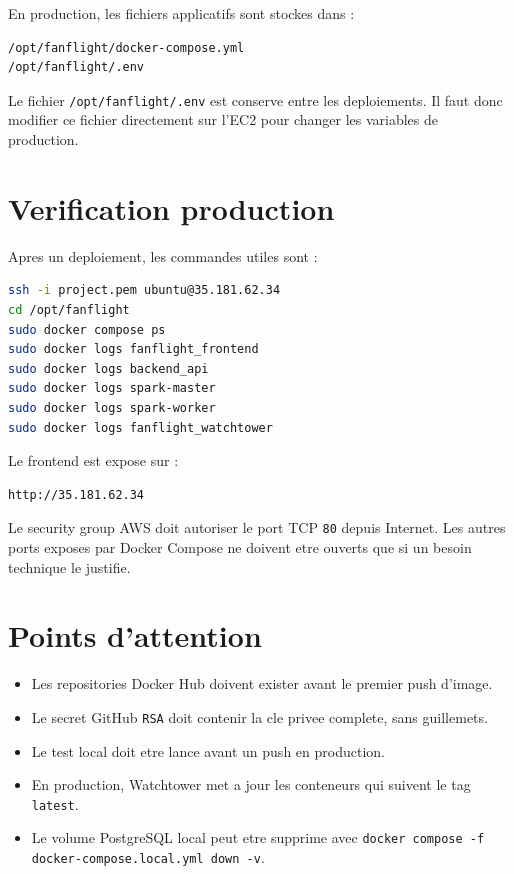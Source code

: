 \documentclass[12pt,a4paper]{article}
\begin{document}
En production, les fichiers applicatifs sont stockes dans :

\begin{lstlisting}
/opt/fanflight/docker-compose.yml
/opt/fanflight/.env
\end{lstlisting}

Le fichier \texttt{/opt/fanflight/.env} est conserve entre les deploiements.
Il faut donc modifier ce fichier directement sur l'EC2 pour changer les variables de production.

\section{Verification production}

Apres un deploiement, les commandes utiles sont :

\begin{lstlisting}[language=bash]
ssh -i project.pem ubuntu@35.181.62.34
cd /opt/fanflight
sudo docker compose ps
sudo docker logs fanflight_frontend
sudo docker logs backend_api
sudo docker logs spark-master
sudo docker logs spark-worker
sudo docker logs fanflight_watchtower
\end{lstlisting}

Le frontend est expose sur :

\begin{lstlisting}
http://35.181.62.34
\end{lstlisting}

Le security group AWS doit autoriser le port TCP \texttt{80} depuis Internet.
Les autres ports exposes par Docker Compose ne doivent etre ouverts que si un besoin technique le justifie.

\section{Points d'attention}

\begin{itemize}
  \item Les repositories Docker Hub doivent exister avant le premier push d'image.
  \item Le secret GitHub \texttt{RSA} doit contenir la cle privee complete, sans guillemets.
  \item Le test local doit etre lance avant un push en production.
  \item En production, Watchtower met a jour les conteneurs qui suivent le tag \texttt{latest}.
  \item Le volume PostgreSQL local peut etre supprime avec \texttt{docker compose -f docker-compose.local.yml down -v}.
\end{itemize}
\end{document}
